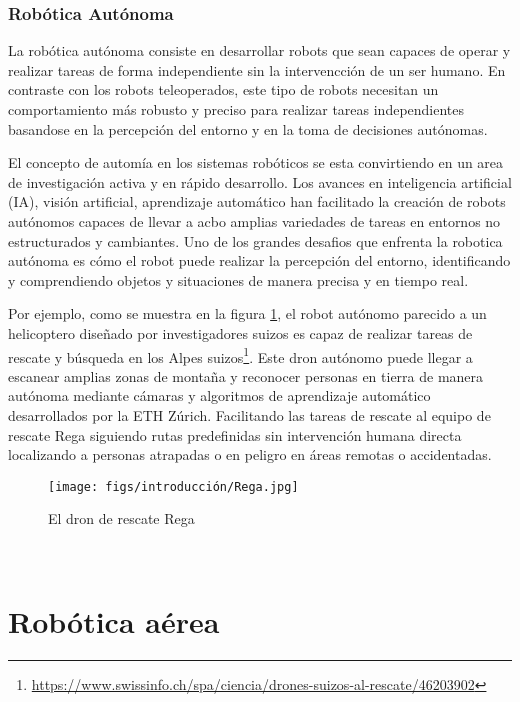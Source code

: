 \subsubsection{Robótica Autónoma}
\label{sec:subseccion}

La robótica autónoma consiste en desarrollar robots que sean capaces de operar y realizar tareas de forma independiente sin la intervencción de un ser humano. En contraste con los 
robots teleoperados, este tipo de robots necesitan un comportamiento más robusto y preciso para realizar tareas independientes basandose en la percepción del entorno 
y en la toma de decisiones autónomas. \newline

El concepto de automía en los sistemas robóticos se esta convirtiendo en un area de investigación activa y en rápido desarrollo. Los avances en inteligencia artificial (IA), visión 
artificial, aprendizaje automático han facilitado la creación de robots autónomos capaces de llevar a acbo amplias variedades de tareas en entornos no estructurados y cambiantes. 
Uno de los grandes desafios que enfrenta la robotica autónoma es cómo el robot puede realizar la percepción del entorno, identificando y comprendiendo objetos y situaciones de manera
precisa y en tiempo real. \newline

Por ejemplo, como se muestra en la figura \ref{fig:Rega}, el robot autónomo parecido a un helicoptero diseñado por investigadores suizos es capaz de realizar tareas de 
rescate y búsqueda en los Alpes suizos\footnote{\url{https://www.swissinfo.ch/spa/ciencia/drones-suizos-al-rescate/46203902}}. Este dron autónomo puede llegar a escanear amplias zonas de montaña y reconocer personas en tierra de manera autónoma mediante
cámaras y algoritmos de aprendizaje automático desarrollados por la ETH Zúrich. Facilitando las tareas de rescate al equipo de rescate Rega siguiendo rutas
predefinidas sin intervención humana directa localizando a personas atrapadas o en peligro en áreas remotas o accidentadas.

\begin{figure} [H]
  \begin{center}
    \texttt{[image: figs/introducción/Rega.jpg]}
  \end{center}
  \caption{El dron de rescate Rega}
  \label{fig:Rega}
\end{figure}\

\section{Robótica aérea}
\label{sec:subseccion}


